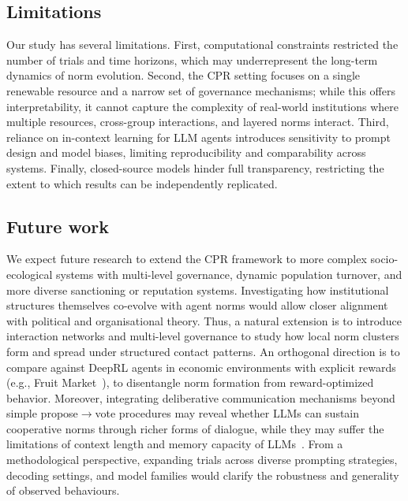 \documentclass[sigconf]{aamas}
\begin{document}
\subsection{Limitations}
Our study has several limitations.
First, computational constraints restricted the number of trials and time horizons, which may underrepresent the long-term dynamics of norm evolution. 
Second, the CPR setting focuses on a single renewable resource and a narrow set of governance mechanisms; while this offers interpretability, it cannot capture the complexity of real-world institutions where multiple resources, cross-group interactions, and layered norms interact. 
Third, reliance on in-context learning for LLM agents introduces sensitivity to prompt design and model biases, limiting reproducibility and comparability across systems. 
Finally, closed-source models hinder full transparency, restricting the extent to which results can be independently replicated.

\subsection{Future work}
We expect future research to extend the CPR framework to more complex socio-ecological systems with multi-level governance, dynamic population turnover, and more diverse sanctioning or reputation systems. 
Investigating how institutional structures themselves co-evolve with agent norms would allow closer alignment with political and organisational theory. 
Thus, a natural extension is to introduce interaction networks and multi-level governance to study how local norm clusters form and spread under structured contact patterns.
An orthogonal direction is to compare against DeepRL agents in economic environments with explicit rewards (e.g., Fruit Market~\cite{johanson2022emergent}), to disentangle norm formation from reward-optimized behavior.
Moreover, integrating deliberative communication mechanisms beyond simple propose$\to$vote procedures may reveal whether LLMs can sustain cooperative norms through richer forms of dialogue, while they may suffer the limitations of context length and memory capacity of LLMs~\cite{park2023generative}. 
From a methodological perspective, expanding trials across diverse prompting strategies, decoding settings, and model families would clarify the robustness and generality of observed behaviours.
\end{document}
